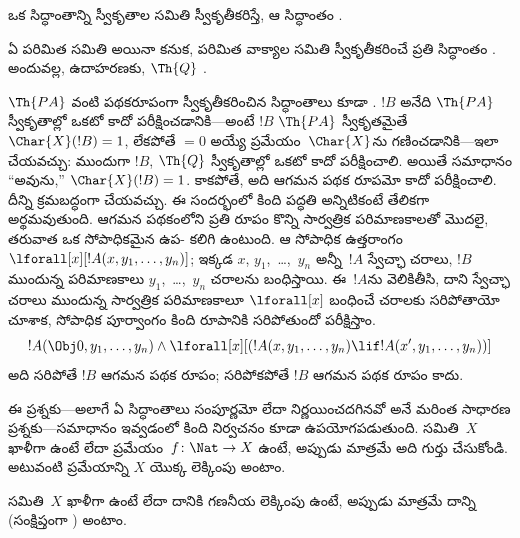 \documentclass[../../../include/open-logic-section]{subfiles}
\begin{document}
\begin{defn}
ఒక సిద్ధాంతాన్ని  స్వీకృతాల సమితి
స్వీకృతీకరిస్తే, ఆ సిద్ధాంతం \emph{}.
\end{defn}

\begin{ex}
ఏ పరిమిత  సమితి అయినా
 కనుక, పరిమిత వాక్యాల సమితి
స్వీకృతీకరించే ప్రతి సిద్ధాంతం .
అందువల్ల, ఉదాహరణకు, $\Th{Q}$ .

$\Th{PA}$ వంటి పథకరూపంగా స్వీకృతీకరించిన సిద్ధాంతాలు కూడా
. $!B$ అనేది $\Th{PA}$
స్వీకృతాల్లో ఒకటో కాదో పరీక్షించడానికి---అంటే $!B$ $\Th{PA}$ స్వీకృతమైతే
$\Char{X}(!B)=1$, లేకపోతే $=0$ అయ్యే ప్రమేయం~$\Char{X}$ను గణించడానికి---ఇలా
చేయవచ్చు: ముందుగా $!B$, $\Th{Q}$ స్వీకృతాల్లో ఒకటో కాదో పరీక్షించాలి. అయితే
సమాధానం ``అవును,'' $\Char{X}(!B)=1$. కాకపోతే, అది ఆగమన పథక రూపమో కాదో
పరీక్షించాలి. దీన్ని క్రమబద్ధంగా చేయవచ్చు. ఈ సందర్భంలో కింది పద్ధతి
అన్నిటికంటే తేలికగా అర్థమవుతుంది. ఆగమన పథకంలోని ప్రతి రూపం కొన్ని సార్వత్రిక పరిమాణకాలతో
మొదలై, తరువాత ఒక సోపాధికమైన ఉప- కలిగి ఉంటుంది.
ఆ సోపాధిక ఉత్తరాంగం $\lforall[x][!A(x,y_1,\dots,y_n)]$; ఇక్కడ $x$,
$y_1$,~\dots,~$y_n$ అన్నీ~$!A$ స్వేచ్ఛా చరాలు, $!B$ ముందున్న పరిమాణకాలు
$y_1$,~\dots,~$y_n$ చరాలను బంధిస్తాయి. ఈ~$!A$ను వెలికితీసి, దాని స్వేచ్ఛా
చరాలు ముందున్న సార్వత్రిక పరిమాణకాలూ $\lforall[x]$ బంధించే చరాలకు సరిపోతాయో
చూశాక, సోపాధిక పూర్వాంగం కింది రూపానికి సరిపోతుందో పరీక్షిస్తాం.
\[
!A(\Obj 0, y_1, \dots, y_n) \land \lforall[x][(!A(x, y_1, \dots, y_n)
\lif !A(x', y_1, \dots, y_n))]
\]
అది సరిపోతే $!B$ ఆగమన పథక రూపం; సరిపోకపోతే $!B$ ఆగమన పథక రూపం కాదు.
\end{ex}

ఈ ప్రశ్నకు---అలాగే ఏ సిద్ధాంతాలు సంపూర్ణమో లేదా నిర్ణయించదగినవో అనే మరింత
సాధారణ ప్రశ్నకు---సమాధానం ఇవ్వడంలో కింది నిర్వచనం కూడా ఉపయోగపడుతుంది. సమితి~$X$
ఖాళీగా ఉంటే లేదా  ప్రమేయం~$f\colon\Nat
\to X$ ఉంటే, అప్పుడు మాత్రమే అది 
గుర్తు చేసుకోండి. అటువంటి ప్రమేయాన్ని $X$ యొక్క లెక్కింపు అంటాం.

\begin{defn}
సమితి~$X$ ఖాళీగా ఉంటే లేదా దానికి గణనీయ లెక్కింపు ఉంటే, అప్పుడు మాత్రమే దాన్ని
\emph{} (సంక్షిప్తంగా
) అంటాం.
\end{defn}
\end{document}
